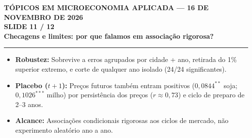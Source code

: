 \documentclass[11pt,a4paper]{article}
\newcommand{\slidenum}{1}
\begin{document}
\newpage

\renewcommand{\slidenum}{11}
\noindent
\begin{minipage}{\textwidth}
\begin{center}
{\color{cinza}\footnotesize\textbf{TÓPICOS EM MICROECONOMIA APLICADA --- 16 DE NOVEMBRO DE 2026}\\[1.2mm]}
{\color{cinza}\bfseries\Large SLIDE 11 / 12\\[1.5mm]}
{\color{verde}\bfseries\LARGE Checagens e limites: por que falamos em associação rigorosa?\\[2.5mm]}
\rule{\textwidth}{1pt}
\end{center}
\end{minipage}
\vspace{1.5mm}

\begin{tcolorbox}[title={\bfseries\small ÂNCORAS DO SLIDE}]
\begin{itemize}[leftmargin=*,itemsep=1mm,topsep=0.5mm]
    \item \textbf{Robustez:} Sobrevive a erros agrupados por cidade + ano, retirada do 1\% superior extremo, e corte de qualquer ano isolado (24/24 significantes).
    \item \textbf{Placebo ($t+1$):} Preços futuros também entram positivos ($0{,}0844^{**}$ soja; $0{,}1026^{***}$ milho) por persistência dos preços ($r \approx 0{,}73$) e ciclo de preparo de 2--3 anos.
    \item \textbf{Alcance:} Associações condicionais rigorosas aos ciclos de mercado, não experimento aleatório ano a ano.
\end{itemize}
\end{tcolorbox}
\vspace{2mm}
\end{document}
